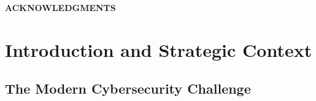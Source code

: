 \documentclass[12pt,oneside]{article}
\newcommand{\kwz}[1]{
  {\color{magenta} [KWZ: {#1}]}
 }
\begin{document}
\clearpage
\begin{center}
\large\textbf{ACKNOWLEDGMENTS}
\end{center}

\clearpage

\listoffigures
\clearpage

\listoftables
\clearpage

\setcounter{page}{1}
\pagestyle{fancy}
\fancyhf{}
\fancyfoot[C]{\thepage}
\clearpage
\section{Introduction and Strategic Context}

\subsection{The Modern Cybersecurity Challenge}

\end{document}
